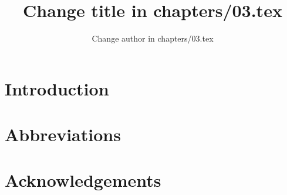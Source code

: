 \documentclass[output=paper]{langsci/langscibook}
\author{Change author in chapters/03.tex}
\title{Change title in chapters/03.tex}
\begin{document}
\section{Introduction} 

 
\section*{Abbreviations}
\section*{Acknowledgements}

\sloppy
\printbibliography[heading=subbibliography,notkeyword=this] 
\end{document}
